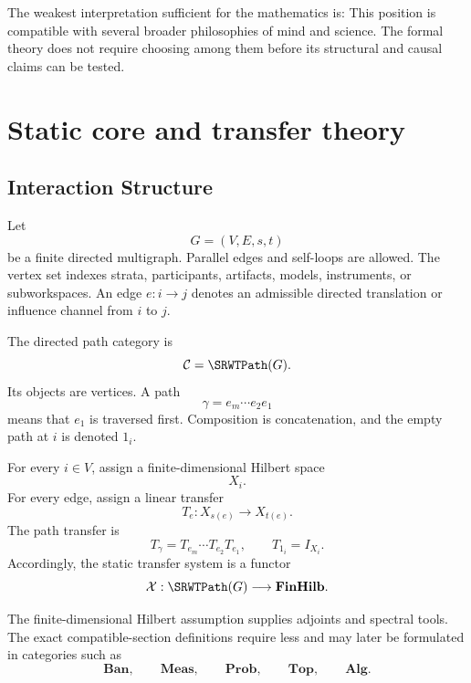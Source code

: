 
The weakest interpretation sufficient for the mathematics is:
This position is compatible with several broader philosophies of mind and
science. The formal theory does not require choosing among them before its
structural and causal claims can be tested.


\chapter{Static core and transfer theory}\label{SRWT:book:chapter-68}


\section{Interaction Structure}

\begin{SRWTdefinition}\label{SRWT:def:interaction-graph}
Let
\[
G=(V,E,s,t)
\]
be a finite directed multigraph. Parallel edges and self-loops are allowed.
The vertex set indexes strata, participants, artifacts, models, instruments,
or subworkspaces. An edge \(e:i\to j\) denotes an admissible directed
translation or influence channel from \(i\) to \(j\).
\end{SRWTdefinition}

The directed path category is
\[
\mathcal C=\SRWTPath(G).
\]
Its objects are vertices. A path
\[
\gamma=e_m\cdots e_2e_1
\]
means that \(e_1\) is traversed first. Composition is concatenation, and the
empty path at \(i\) is denoted \(1_i\).

For every \(i\in V\), assign a finite-dimensional Hilbert space
\[
X_i.
\]
For every edge, assign a linear transfer
\[
T_e:X_{s(e)}\longrightarrow X_{t(e)}.
\]
The path transfer is
\[
T_\gamma=T_{e_m}\cdots T_{e_2}T_{e_1},
\qquad
T_{1_i}=I_{X_i}.
\]
Accordingly, the static transfer system is a functor
\[
\mathcal X:\SRWTPath(G)\longrightarrow\mathbf{FinHilb}.
\]

The finite-dimensional Hilbert assumption supplies adjoints and spectral
tools. The exact compatible-section definitions require less and may later be
formulated in categories such as
\[
\mathbf{Ban},\qquad
\mathbf{Meas},\qquad
\mathbf{Prob},\qquad
\mathbf{Top},\qquad
\mathbf{Alg}.
\]

